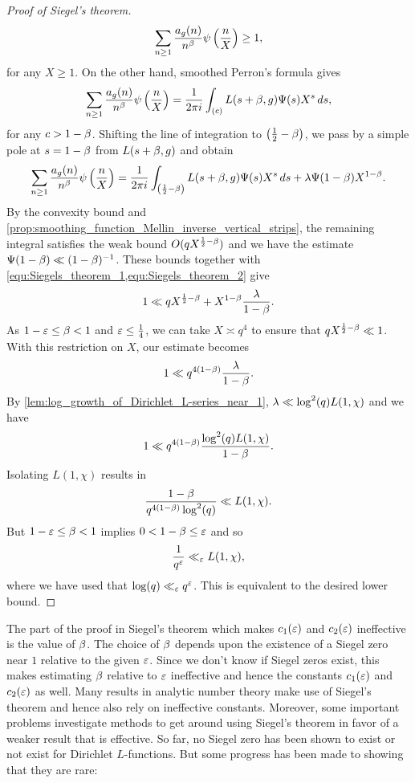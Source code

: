\begin{proof}[Proof of Siegel's theorem]
      \begin{equation}\label{equ:Siegels_theorem_1}
        \sum_{n \ge 1}\frac{a_{g}(n)}{n^{\beta}}\psi\left(\frac{n}{X}\right) \ge 1,
      \end{equation}
      for any $X \ge 1$. On the other hand, smoothed Perron's formula gives
      \[
        \sum_{n \ge 1}\frac{a_{g}(n)}{n^{\beta}}\psi\left(\frac{n}{X}\right) = \frac{1}{2\pi i}\int_{(c)}L(s+\beta,g)\Psi(s)X^{s}\,ds,
      \]
      for any $c > 1-\beta$. Shifting the line of integration to $\left(\frac{1}{2}-\beta\right)$, we pass by a simple pole at $s = 1-\beta$ from $L(s+\beta,g)$ and obtain
      \begin{equation}\label{equ:Siegels_theorem_2}
        \sum_{n \ge 1}\frac{a_{g}(n)}{n^{\beta}}\psi\left(\frac{n}{X}\right) = \frac{1}{2\pi i}\int_{\left(\frac{1}{2}-\beta\right)}L(s+\beta,g)\Psi(s)X^{s}\,ds+\lambda\Psi(1-\beta)X^{1-\beta}.
      \end{equation}
      By the convexity bound and \cref{prop:smoothing_function_Mellin_inverse_vertical_strips}, the remaining integral satisfies the weak bound $O(qX^{\frac{1}{2}-\beta})$ and we have the estimate $\Psi(1-\beta) \ll (1-\beta)^{-1}$. These bounds together with \cref{equ:Siegels_theorem_1,equ:Siegels_theorem_2} give
      \[
        1 \ll qX^{\frac{1}{2}-\beta}+X^{1-\beta}\frac{\lambda}{1-\beta}.
      \]
      As $1-\varepsilon \le \beta < 1$ and $\varepsilon \le \frac{1}{4}$, we can take $X \asymp q^{4}$ to ensure that $qX^{\frac{1}{2}-\beta} \ll 1$. With this restriction on $X$, our estimate becomes
      \[
        1 \ll q^{4(1-\beta)}\frac{\lambda}{1-\beta}.
      \]
      By \cref{lem:log_growth_of_Dirichlet_L-series_near_1}, $\lambda \ll \log^{2}(q)L(1,\chi)$ and we have
      \[
        1 \ll q^{4(1-\beta)}\frac{\log^{2}(q)L(1,\chi)}{1-\beta}.
      \]
      Isolating $L(1,\chi)$ results in
      \[
        \frac{1-\beta}{q^{4(1-\beta)}\log^{2}(q)} \ll L(1,\chi).
      \]
      But $1-\varepsilon \le \beta < 1$ implies $0< 1-\beta \le \varepsilon$ and so
      \[
        \frac{1}{q^{\varepsilon}} \ll_{\varepsilon} L(1,\chi),
      \]
      where we have used that $\log(q) \ll_{\varepsilon} q^{\varepsilon}$. This is equivalent to the desired lower bound.
    \end{proof}

    The part of the proof in Siegel's theorem which makes $c_{1}(\varepsilon)$ and $c_{2}(\varepsilon)$ ineffective is the value of $\beta$. The choice of $\beta$ depends upon the existence of a Siegel zero near $1$ relative to the given $\varepsilon$. Since we don't know if Siegel zeros exist, this makes estimating $\beta$ relative to $\varepsilon$ ineffective and hence the constants $c_{1}(\varepsilon)$ and $c_{2}(\varepsilon)$ as well. Many results in analytic number theory make use of Siegel's theorem and hence also rely on ineffective constants. Moreover, some important problems investigate methods to get around using Siegel's theorem in favor of a weaker result that is effective. So far, no Siegel zero has been shown to exist or not exist for Dirichlet $L$-functions. But some progress has been made to showing that they are rare:

